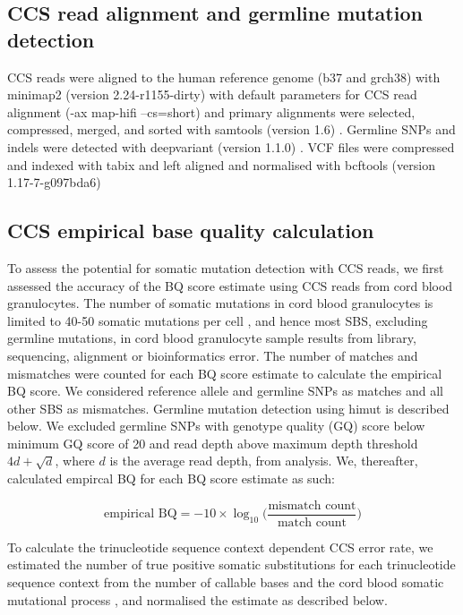 \subsection{CCS read alignment and germline mutation detection}
CCS reads were aligned to the human reference genome (b37 and grch38) with minimap2 (version 2.24-r1155-dirty) with default parameters for CCS read alignment (-ax map-hifi --cs=short) \cite{Li2018-am} and primary alignments were selected, compressed, merged, and sorted with samtools (version 1.6) \cite{Li2009-qp}. Germline SNPs and indels were detected with deepvariant (version 1.1.0) \cite{Poplin2018-ub}. VCF files were compressed and indexed with tabix \cite{Li2011-zj} and left aligned and normalised with bcftools (version 1.17-7-g097bda6) \cite{Li2011-ag}

\subsection{CCS empirical base quality calculation}

To assess the potential for somatic mutation detection with CCS reads, we first assessed the accuracy of the BQ score estimate using CCS reads from cord blood granulocytes. The number of somatic mutations in cord blood granulocytes is limited to 40-50 somatic mutations per cell \cite{Osorio2018-mh}, and hence most SBS, excluding germline mutations, in cord blood granulocyte sample results from library, sequencing, alignment or bioinformatics error. The number of matches and mismatches were counted for each BQ score estimate to calculate the empirical BQ score. We considered reference allele and germline SNPs as matches and all other SBS as mismatches. Germline mutation detection using himut is described below. We excluded germline SNPs with genotype quality (GQ) score below minimum GQ score of 20 and read depth above maximum depth threshold $4d + \sqrt{d}$, where $d$ is the average read depth, from analysis. We, thereafter, calculated empircal BQ for each BQ score estimate as such:

\begin{equation}
\text{empirical BQ} = -10 \times \log_{10} \Big( \frac{\text{mismatch count}}{\text{match count}} \Big)
\end{equation}

To calculate the trinucleotide sequence context dependent CCS error rate, we estimated the number of true positive somatic substitutions for each trinucleotide sequence context from the number of callable bases and the cord blood somatic mutational process \cite{Mitchell2022-ry}, and normalised the estimate as described below. 

